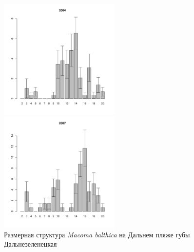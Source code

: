 \begin{figure}[hp]
\begin{minipage}[b]{.3\linewidth}
\begin{center}
	\end{center}
	\end{minipage}
	\begin{minipage}[b]{.3\linewidth}
	\begin{center}
	\includegraphics[width=60mm]{../Barenc_Sea/Dalnezeleneckaya/DZ2_2004_.pdf}
	\end{center}
	\end{minipage}	
	\hfill
	\begin{minipage}[b]{.3\linewidth}
	\begin{center}
	\includegraphics[width=60mm]{../Barenc_Sea/Dalnezeleneckaya/DZ2_2007_.pdf}
	\end{center}
	\end{minipage}
	\hfill
	\begin{minipage}[b]{.3\linewidth}
	\begin{center}

	\end{center}
	\end{minipage}

\caption{Размерная структура {\it Macoma balthica} на Дальнем пляже губы Дальнезеленецкая}
\label{ris:size_str_DZ}
\end{figure}
